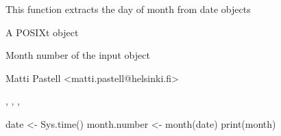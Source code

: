 \documentclass{book}
\begin{document}
\begin{Description}\relax
This function extracts the day of month from date objects
\end{Description}
\begin{Arguments}
\begin{ldescription}
\item[\code{x}] A POSIXt object
\end{ldescription}
\end{Arguments}
\begin{Value}
\begin{ldescription}
\item[\code{month}] Month number of the input object
\end{ldescription}
\end{Value}
\begin{Author}\relax
Matti Pastell <matti.pastell@helsinki.fi>
\end{Author}
\begin{SeeAlso}\relax
{}, ,
,
\end{SeeAlso}
\begin{Examples}
\begin{ExampleCode}
date <- Sys.time()
month.number <- month(date)
print(month)
\end{ExampleCode}
\end{Examples}
\end{document}
